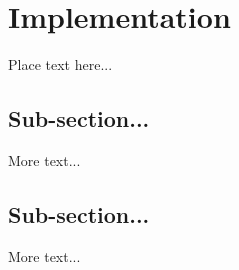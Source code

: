 
\section{Implementation}
\label{sec:imple}

Place text here...


\subsection{Sub-section...}

More text...


\subsection{Sub-section...}

More text...

